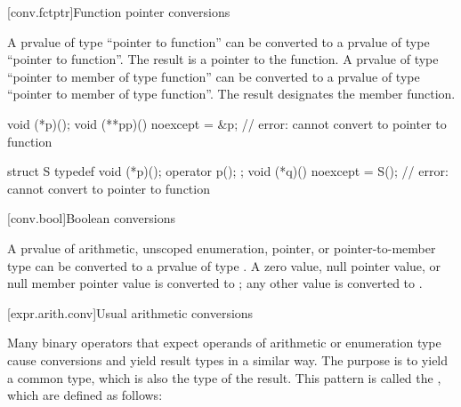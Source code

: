 [conv.fctptr]{Function pointer conversions}

\pnum
{}%
A prvalue of type ``pointer to  function''
can be converted to a prvalue of type ``pointer to function''.
The result is a pointer to the function.
A prvalue of type ``pointer to member of type  function''
can be converted to a prvalue of type ``pointer to member of type function''.
The result designates the member function.

\begin{example}
\begin{codeblock}
void (*p)();
void (**pp)() noexcept = &p;    // error: cannot convert to pointer to  function

struct S { typedef void (*p)(); operator p(); };
void (*q)() noexcept = S();     // error: cannot convert to pointer to  function
\end{codeblock}
\end{example}

[conv.bool]{Boolean conversions}

\pnum
{}%
A prvalue of arithmetic, unscoped enumeration, pointer, or pointer-to-member
type can be converted to a prvalue of type . A zero value, null
pointer value, or null member pointer value is converted to ; any
other value is converted to .


[expr.arith.conv]{Usual arithmetic conversions}

\pnum
Many binary operators that expect operands of arithmetic or enumeration
type cause conversions and yield result types in a similar way. The
purpose is to yield a common type, which is also the type of the result.
This pattern is called the ,
which are defined as follows:

